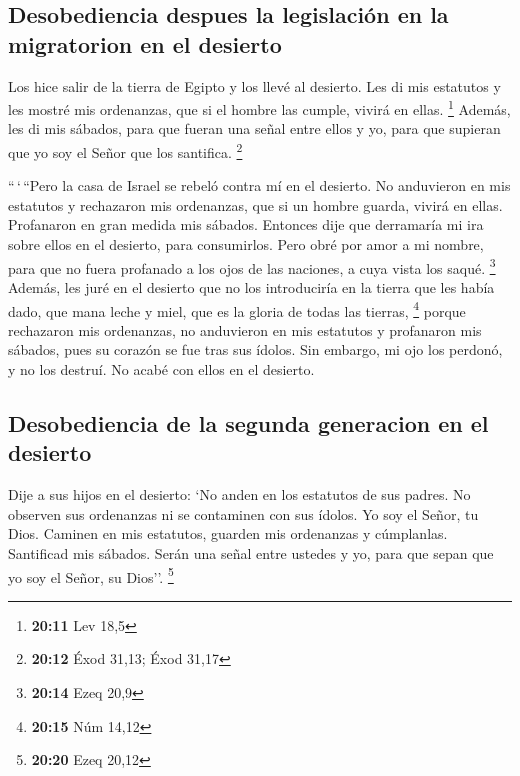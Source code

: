 \begin{paracol}{2}
\hypertarget{desobediencia-despues-la-legislaciuxf3n-en-la-migratorion-en-el-desierto}{%
\subsection{Desobediencia despues la legislación en la migratorion en el
desierto}\label{desobediencia-despues-la-legislaciuxf3n-en-la-migratorion-en-el-desierto}}

 Los hice salir de la tierra de Egipto y los llevé al
desierto.  Les di mis estatutos y les mostré mis
ordenanzas, que si el hombre las cumple, vivirá en ellas. \footnote{\textbf{20:11}
  Lev 18,5}  Además, les di mis sábados, para que fueran
una señal entre ellos y yo, para que supieran que yo soy el Señor que
los santifica. \footnote{\textbf{20:12} Éxod 31,13; Éxod 31,17}

 ``\,`\,``Pero la casa de Israel se rebeló contra mí en
el desierto. No anduvieron en mis estatutos y rechazaron mis ordenanzas,
que si un hombre guarda, vivirá en ellas. Profanaron en gran medida mis
sábados. Entonces dije que derramaría mi ira sobre ellos en el desierto,
para consumirlos.  Pero obré por amor a mi nombre, para
que no fuera profanado a los ojos de las naciones, a cuya vista los
saqué. \footnote{\textbf{20:14} Ezeq 20,9}  Además, les
juré en el desierto que no los introduciría en la tierra que les había
dado, que mana leche y miel, que es la gloria de todas las tierras,
\footnote{\textbf{20:15} Núm 14,12}  porque rechazaron
mis ordenanzas, no anduvieron en mis estatutos y profanaron mis sábados,
pues su corazón se fue tras sus ídolos.  Sin embargo, mi
ojo los perdonó, y no los destruí. No acabé con ellos en el desierto.

\hypertarget{desobediencia-de-la-segunda-generacion-en-el-desierto}{%
\subsection{Desobediencia de la segunda generacion en el
desierto}\label{desobediencia-de-la-segunda-generacion-en-el-desierto}}

 Dije a sus hijos en el desierto: `No anden en los
estatutos de sus padres. No observen sus ordenanzas ni se contaminen con
sus ídolos.  Yo soy el Señor, tu Dios. Caminen en mis
estatutos, guarden mis ordenanzas y cúmplanlas. 
Santificad mis sábados. Serán una señal entre ustedes y yo, para que
sepan que yo soy el Señor, su Dios''. \footnote{\textbf{20:20} Ezeq
  20,12}


\end{paracol}
